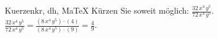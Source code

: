 \begin{MAufgabe}{Kuerzen}{kr, dh, MaTeX}
K\"urzen Sie soweit m\"oglich: $\frac{32\, x^4\, y^5}{72\, x^4\, y^5}$.\\ 
\ifLsg\MLoesung
\quad $\frac{32\, x^4\, y^5}{72\, x^4\, y^5}=\frac{(8\, x^4\, y^5)\cdot(4)}{(8\, x^4\, y^5)\cdot(9)}=\frac{4}{9}$.\else\relax\fi
 \end{MAufgabe}